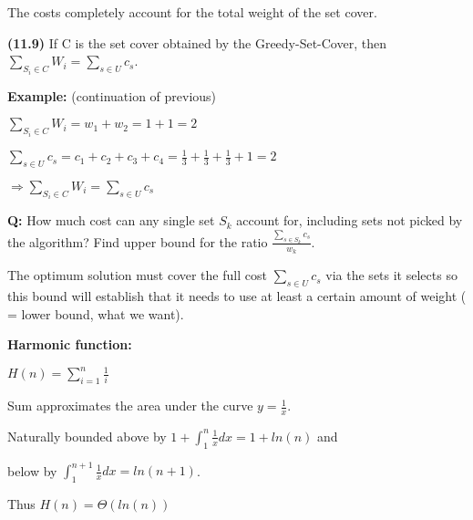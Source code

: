 \documentclass{proc}
\begin{document}
The costs completely account for the total weight of the set cover.

\begin{mdframed}
    \textbf{(11.9)} If C is the set cover obtained by the Greedy-Set-Cover, then $\sum_{S_i \in C} W_i = \sum_{s \in U} c_s$.
\end{mdframed}

\begin{mdframed}
    \textbf{Example:} (continuation of previous)

    $\sum_{S_i \in C} W_i = w_{1} + w_{2} = 1 + 1 = 2$
    
    $\sum_{s \in U} c_s = c_1 + c_2 + c_3 + c_4 = \frac{1}{3} + \frac{1}{3} + \frac{1}{3} + 1 = 2$
    
    $\Rightarrow \sum_{S_i \in C} W_i = \sum_{s \in U} c_s$
\end{mdframed}

\textbf{Q:} How much cost can any single set $S_k$ account for, including sets not picked by the algorithm? Find upper bound for the ratio $\frac{\sum_{s \in S_k} c_s}{w_k}$.

The optimum solution must cover the full cost $\sum_{s \in U} c_s$ via the sets it selects so this bound will establish that it needs to use at least a certain amount of weight ( = lower bound, what we want).

\begin{mdframed}
    \textbf{Harmonic function:}
    
    $H(n) = \sum_{i=1}^{n} \frac{1}{i}$
    
    Sum approximates the area under the curve $y = \frac{1}{x}$.
    
    Naturally bounded above by $1 + \int_{1}^{n} \frac{1}{x} dx = 1 + ln(n)$ and
    
    below by $\int_{1}^{n+1} \frac{1}{x} dx = ln(n + 1)$.
    
    Thus $H(n) = \Theta(ln(n))$
\end{mdframed}
\end{document}
